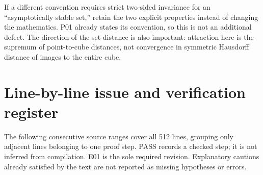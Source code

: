 \documentclass[11pt]{article}
\begin{document}
If a different convention requires strict two-sided invariance for an
``asymptotically stable set,'' retain the two explicit properties instead
of changing the mathematics. P01 already states its convention, so this
is not an additional defect. The direction of the set distance is also
important: attraction here is the supremum of point-to-cube distances,
not convergence in symmetric Hausdorff distance of images to the entire cube.

\section{Line-by-line issue and verification register}
The following consecutive source ranges cover all 512 lines, grouping
only adjacent lines belonging to one proof step. PASS records a checked
step; it is not inferred from compilation. E01 is the sole required
revision. Explanatory cautions already satisfied by the text are not
reported as missing hypotheses or errors.
\end{document}
